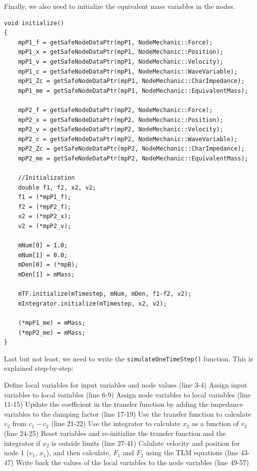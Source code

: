 \documentclass[a4paper,pdftex]{article}
\begin{document}
 
\noindent Finally, we also need to initialize the equivalent mass variables in the nodes.

\noindent 
\begin{minipage}{\linewidth}
\begin{lstlisting}[basicstyle=\footnotesize\ttfamily]
void initialize()
{
    mpP1_f = getSafeNodeDataPtr(mpP1, NodeMechanic::Force);
    mpP1_x = getSafeNodeDataPtr(mpP1, NodeMechanic::Position);
    mpP1_v = getSafeNodeDataPtr(mpP1, NodeMechanic::Velocity);
    mpP1_c = getSafeNodeDataPtr(mpP1, NodeMechanic::WaveVariable);
    mpP1_Zc = getSafeNodeDataPtr(mpP1, NodeMechanic::CharImpedance);
    mpP1_me = getSafeNodeDataPtr(mpP1, NodeMechanic::EquivalentMass);

    mpP2_f = getSafeNodeDataPtr(mpP2, NodeMechanic::Force);
    mpP2_x = getSafeNodeDataPtr(mpP2, NodeMechanic::Position);
    mpP2_v = getSafeNodeDataPtr(mpP2, NodeMechanic::Velocity);
    mpP2_c = getSafeNodeDataPtr(mpP2, NodeMechanic::WaveVariable);
    mpP2_Zc = getSafeNodeDataPtr(mpP2, NodeMechanic::CharImpedance);
    mpP2_me = getSafeNodeDataPtr(mpP2, NodeMechanic::EquivalentMass);

    //Initialization
    double f1, f2, x2, v2;
    f1 = (*mpP1_f);
    f2 = (*mpP2_f);
    x2 = (*mpP2_x);
    v2 = (*mpP2_v);

    mNum[0] = 1.0;
    mNum[1] = 0.0;
    mDen[0] = (*mpB);
    mDen[1] = mMass;

    mTF.initialize(mTimestep, mNum, mDen, f1-f2, v2);
    mIntegrator.initialize(mTimestep, x2, v2); 
    
    (*mpP1_me) = mMass;
    (*mpP2_me) = mMass;
}
\end{lstlisting}
\end{minipage}
 	
 	
Last but not least, we need to write the \texttt{simulateOneTimeStep()} function. This is explained step-by-step: 
\begin{tutenumerate}
Define local variables for input variables and node values (line 3-4)
Assign input variables to local variables (line 6-9)
Assign node variables to local variables (line 11-15)
Update the coefficient in the transfer function by adding the impedance variables to the damping factor (line 17-19)
Use the transfer function to calculate $v_{2}$ from $c_{1}-c_{2}$ (line 21-22)
Use the integrator to calculate $x_{2}$ as a function of $v_{2}$ (line 24-25)
Reset variables and re-initialize the transfer function and the integrator if $x_{2}$ is outside limits (line 27-41)
Calulate velocity and position for node 1 ($v_{1}$, $x_{1}$), and then calculate, $F_{1}$ and $F_{2}$ using the TLM equations (line 43-47)
Write back the values of the local variables to the node variables (line 49-57)
\end{tutenumerate}
 	
\end{document}
